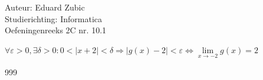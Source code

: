 \documentclass[a4paper]{article}
\begin{document}
  
\noindent \large Auteur: Eduard Zubic \\
\noindent \large Studierichting: Informatica\\
\noindent \large Oefeningenreeks 2C nr. 10.1\\

\medskip

\normalsize

$ \forall\varepsilon > 0, \exists\delta > 0 : 0 < |x + 2| < \delta \Rightarrow |g(x) - 2| < \varepsilon \Leftrightarrow \lim\limits_{x\rightarrow -2}g(x) = 2 $\\



\begin{thebibliography}{999} 
\end{thebibliography}
\end{document}
